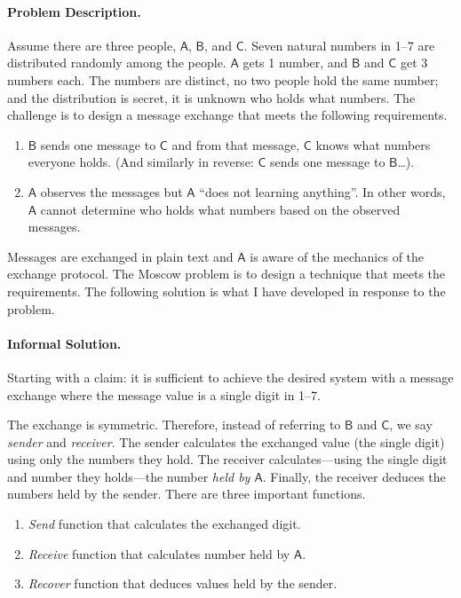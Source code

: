 \paragraph*{Problem Description.}
Assume there are three people, \(\mathsf{A}\), \(\mathsf{B}\), and
\(\mathsf{C}\)\@. Seven natural numbers in 1--7 are distributed randomly among
the people. \(\mathsf{A}\) gets 1 number, and \(\mathsf{B}\) and \(\mathsf{C}\)
get 3 numbers each. The numbers are distinct, \ie no two people hold the same
number; and the distribution is secret, \ie it is unknown who holds what
numbers. The challenge is to design a message exchange that meets the following
requirements.

\begin{enumerate}

\item \(\mathsf{B}\) sends one message to \(\mathsf{C}\) and from that message,
\(\mathsf{C}\) knows what numbers everyone holds. (And similarly in reverse:
\(\mathsf{C}\) sends one message to \(\mathsf{B}\)\ldots).

\item \(\mathsf{A}\) observes the messages but \(\mathsf{A}\) \enquote{does not
learning anything}. In other words, \(\mathsf{A}\) cannot determine who holds
what numbers based on the observed messages.

\end{enumerate}

Messages are exchanged in plain text and \(\mathsf{A}\) is aware of the
mechanics of the exchange protocol. The Moscow problem is to design a technique
that meets the requirements. The following solution is what I have developed in
response to the problem.

\paragraph*{Informal Solution.}
Starting with a claim: it is sufficient to achieve the desired system with a
message exchange where the message value is a single digit in 1--7.

The exchange is symmetric. Therefore, instead of referring to \(\mathsf{B}\) and
\(\mathsf{C}\), we say \emph{sender} and \emph{receiver}. The sender calculates
the exchanged value (the single digit) using only the numbers they hold. The
receiver calculates---using the single digit and number they holds---the number
\emph{held by \(\mathsf{A}\)}. Finally, the receiver deduces the numbers held by
the sender. There are three important functions.
\begin{enumerate}
\item \emph{Send} function that calculates the exchanged digit.
\item \emph{Receive} function that calculates number held by \(\mathsf{A}\).
\item \emph{Recover} function that deduces values held by the sender.
\end{enumerate}

